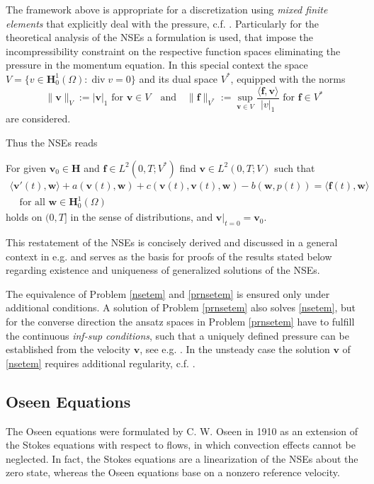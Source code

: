 \documentclass[a4paper,10pt,BCOR=15mm]{scrbook}
\DeclareMathOperator{\dive}{div}
\providecommand{\abs}[1]{\lvert#1\rvert}
\providecommand{\norm}[1]{\lVert#1 \rVert}
\providecommand{\dupa}[2]{\langle #1,#2 \rangle}
\providecommand{\andi}[0]{\quad \text{and} \quad}
\begin{document}
The framework above is appropriate for a discretization using \textit{mixed finite elements} that explicitly deal with the pressure, c.f. \cite{elma, gunz}. Particularly for the theoretical analysis of the NSEs a formulation is used, that impose the incompressibility constraint on the respective function spaces eliminating the pressure in the momentum equation. In this special context the space $V = \{v \in \mathbf H _0^1(\Omega) : \dive v = 0 \}$ and its dual space $V^*$, equipped with the norms 
\begin{equation*}
 \norm{\mathbf v }_V := \abs{\mathbf v }_1 \text{  for  }\mathbf v \in V \andi \norm{\mathbf f}_{V^*} := \sup_{\mathbf v \in V} \frac{\dupa{\mathbf f}{ \mathbf v}}{\abs{v}_1} \text{  for } \mathbf f \in V^*
\end{equation*}
 are considered. 



Thus the NSEs reads 
\begin{prob}\label{nsetem}
For given $\mathbf v_0 \in \mathbf H$ and $\mathbf f \in L^2(0,T;V^*)$ find $\mathbf v \in L^2(0,T;V)$ such that
\begin{align*}
\dupa { \mathbf v'(t)}{ \mathbf w } + a(\mathbf v(t), \mathbf w) + c(\mathbf v(t),\mathbf v(t), \mathbf w)-b(\mathbf w, p(t))=\dupa{\mathbf f(t)}{\mathbf w} \\
\quad \text{for all } \mathbf w \in \mathbf H_0^1(\Omega)
\end{align*}
holds on $(0,T]$ in the sense of distributions, and $\mathbf v \vert _{t=0} = \mathbf v_0$.
\end{prob}
This restatement of the NSEs is concisely derived and discussed in a general context in e.g. \cite{gira2,sohr,tema} and serves as the basis for proofs of the results stated below regarding existence and uniqueness of generalized solutions of the NSEs. 

The equivalence of Problem \ref{nsetem} and \ref{prnsetem} is ensured only under additional conditions. A solution of Problem \ref{prnsetem} also solves \ref{nsetem}, but for the converse direction the ansatz spaces in Problem \ref{prnsetem} have to fulfill the continuous \textit{inf-sup conditions}, such that a uniquely defined pressure can be established from the velocity $\mathbf v$, see e.g. \cite[p. 104]{layt}. In the unsteady case the solution $\mathbf v$ of \ref{nsetem} requires additional regularity, c.f. \cite[p. 434]{quva}.


\subsection{Oseen Equations}
The Oseen equations were formulated by C. W. Oseen in 1910 as an extension of the Stokes equations with respect to flows, in which convection effects cannot be neglected. In fact, the Stokes equations are a linearization of the NSEs about the zero state, whereas the Oseen equations base on a nonzero reference velocity.
\end{document}
